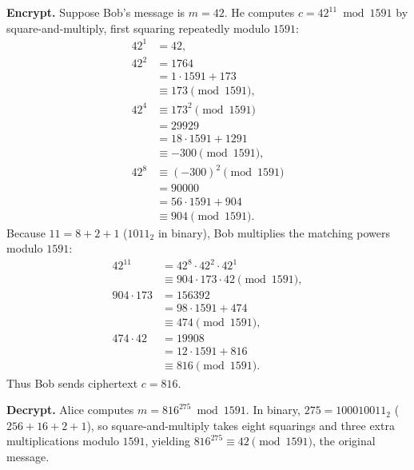 \textbf{Encrypt.} Suppose Bob's message is $m = 42$. He computes $c = 42^{11}\bmod 1591$ by square-and-multiply, first squaring repeatedly modulo $1591$:
\begin{align*}
  42^1 &= 42, \\
  42^2 &= 1764 \\
       &= 1\cdot 1591 + 173 \\
       &\equiv 173 \pmod{1591}, \\[1ex]
  42^4 &\equiv 173^2 \pmod{1591} \\
       &= 29929 \\
       &= 18\cdot 1591 + 1291 \\
       &\equiv -300 \pmod{1591}, \\[1ex]
  42^8 &\equiv (-300)^2 \pmod{1591} \\
       &= 90000 \\
       &= 56\cdot 1591 + 904 \\
       &\equiv 904 \pmod{1591}.
\end{align*}
Because $11 = 8 + 2 + 1$ ($1011_2$ in binary), Bob multiplies the matching powers modulo $1591$:
\begin{align*}
  42^{11} &= 42^8\cdot 42^2\cdot 42^1 \\
          &\equiv 904\cdot 173\cdot 42 \pmod{1591}, \\[1ex]
  904\cdot 173 &= 156392 \\
               &= 98\cdot 1591 + 474 \\
               &\equiv 474 \pmod{1591}, \\[1ex]
  474\cdot 42 &= 19908 \\
              &= 12\cdot 1591 + 816 \\
              &\equiv 816 \pmod{1591}.
\end{align*}
Thus Bob sends ciphertext $c = 816$.

\textbf{Decrypt.} Alice computes $m = 816^{275}\bmod 1591$. In binary, $275 = 100010011_2$ ($256 + 16 + 2 + 1$), so square-and-multiply takes eight squarings and three extra multiplications modulo $1591$, yielding $816^{275}\equiv 42\pmod{1591}$, the original message.

